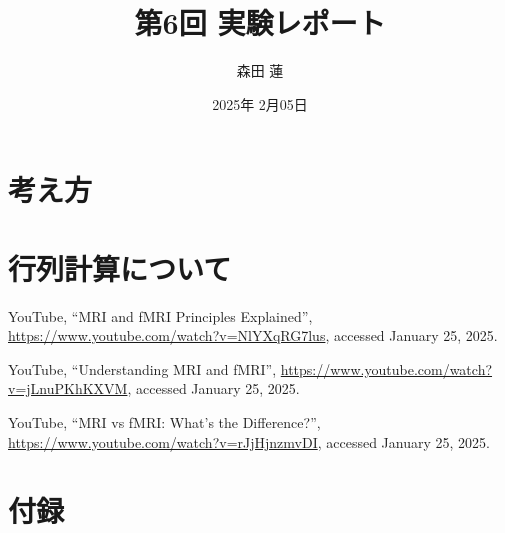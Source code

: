 \documentclass{jlreq}
\title{第6回 実験レポート}
\author{森田 蓮}
\date{2025年 2月05日}
\begin{document}
\maketitle

\section{考え方}


\section{行列計算について}




\begin{thebibliography}{9}

YouTube, ``MRI and fMRI Principles Explained'', \url{https://www.youtube.com/watch?v=NlYXqRG7lus}, accessed January 25, 2025.

YouTube, ``Understanding MRI and fMRI'', \url{https://www.youtube.com/watch?v=jLnuPKhKXVM}, accessed January 25, 2025.

YouTube, ``MRI vs fMRI: What's the Difference?'', \url{https://www.youtube.com/watch?v=rJjHjnzmvDI}, accessed January 25, 2025.

\end{thebibliography}

\section*{付録}
\end{document}

